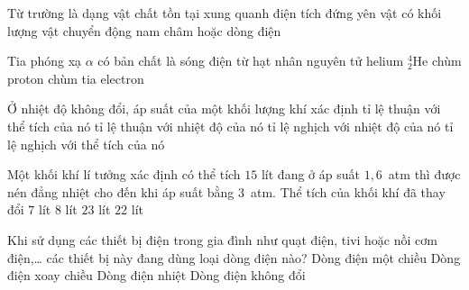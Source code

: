 	\begin{ex}%
		Từ trường là dạng vật chất tồn tại xung quanh
		\choice
		{điện tích đứng yên}
		{vật có khối lượng}
		{vật chuyển động}
		{\True nam châm hoặc dòng điện}
	\end{ex}

	\begin{ex}%
		Tia phóng xạ $\alpha$ có bản chất là
		\choice
		{sóng điện từ}
		{\True hạt nhân nguyên tử helium ${}^4_2\text{He}$}
		{chùm proton}
		{chùm tia electron}
	\end{ex}

	\begin{ex}%
		Ở nhiệt độ không đổi, áp suất của một khối lượng khí xác định
		\choice
		{tỉ lệ thuận với thể tích của nó}
		{tỉ lệ thuận với nhiệt độ của nó}
		{tỉ lệ nghịch với nhiệt độ của nó}
		{\True tỉ lệ nghịch với thể tích của nó}
	\end{ex}

	\begin{ex}%
		Một khối khí lí tưởng xác định có thể tích $15$ lít đang ở áp suất $1{,}6$~atm thì được nén đẳng nhiệt cho đến khi áp suất bằng $3$~atm. Thể tích của khối khí đã thay đổi
		\choice
		{\True $7$ lít}
		{$8$ lít}
		{$23$ lít}
		{$22$ lít}
	\end{ex}

	\begin{ex}%
		Khi sử dụng các thiết bị điện trong gia đình như quạt điện, tivi hoặc nồi cơm điện,\ldots{} các thiết bị này đang dùng loại dòng điện nào?
		\choice
		{Dòng điện một chiều}
		{\True Dòng điện xoay chiều}
		{Dòng điện nhiệt}
		{Dòng điện không đổi}
	\end{ex}

